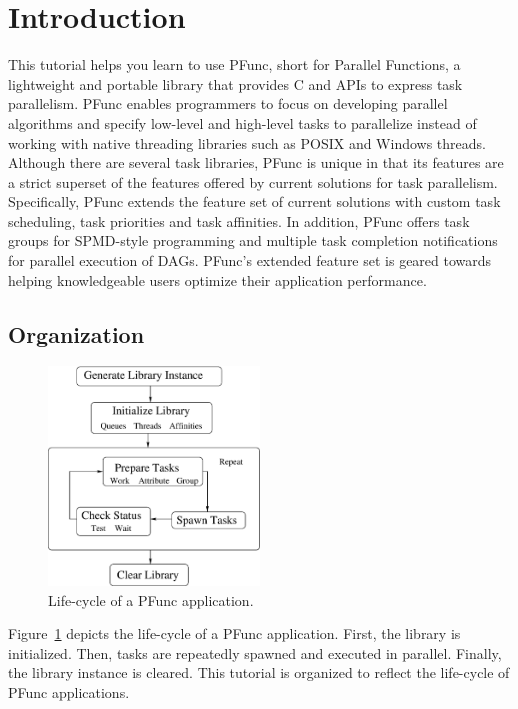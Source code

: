 \section{Introduction}
\label{sec:introduction}

This tutorial helps you learn to use PFunc, short for Parallel Functions, a
lightweight and portable library that provides C and \Cpp{} APIs to express
task parallelism. 
%
PFunc enables programmers to focus on developing parallel algorithms and
specify low-level and high-level tasks to parallelize instead of working with
native threading libraries such as POSIX and Windows threads.
%
Although there are several task libraries, PFunc is unique in that its features
are a strict superset of the features offered by current solutions for task
parallelism.  
%
Specifically, PFunc extends the feature set of current solutions with custom
task scheduling, task priorities and task affinities.
%
In addition, PFunc offers task groups for SPMD-style programming and multiple
task completion notifications for parallel execution of DAGs. 
%
PFunc's extended feature set is geared towards helping knowledgeable users
optimize their application performance. 
%

\subsection{Organization}
\label{subsec:organization}
%
\begin{figure}[t]
\centering
\includegraphics[width=0.5\textwidth]{figs/life-cycle}
\caption{Life-cycle of a PFunc application.}
\label{fig:life_cycle}
\end{figure}
%
Figure~\ref{fig:life_cycle} depicts the life-cycle of a PFunc
application. 
%
First, the library is initialized. Then, tasks are repeatedly spawned and
executed in parallel.  Finally, the library instance is cleared.
%
This tutorial is organized to reflect the life-cycle of PFunc applications.
 
